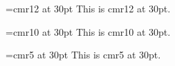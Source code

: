 \font\largecmr=cmr12 at 30pt
\largecmr
This is cmr12 at 30pt.

\font\largecmr=cmr10 at 30pt
\largecmr
This is cmr10 at 30pt.

\font\largecmr=cmr5 at 30pt
\largecmr
This is cmr5 at 30pt.
\bye

